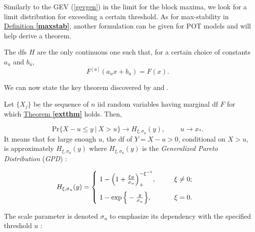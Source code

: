 Similarly to the GEV (\ref{gevgen}) in the limit for the block maxima, we look for a limit distribution for exceeding a certain threshold. As for max-stability in \hyperref[maxstab]{Definition \textbf{\ref{maxstab}}}, another formulation can be given for POT models and will help derive a theorem.

\begin{definition}%
	The dfs $H$ are the only continuous one such that, for a certain choice of constants $a_u$ and $b_u$, 
	\begin{equation*}
	F^{[u]}(a_ux+b_u)=F(x).
	\end{equation*}
\end{definition}
We can now state the key theorem discovered by \citet{balkema_residual_1974} and \citet{iii_statistical_1975-1}.

\begin{theorem}\label{thm:gpd}
	Let $\{X_j\}$ be the sequence of $n$ iid random variables having marginal df $F$ for which \hyperref[extthm]{Theorem \textbf{\ref{extthm}}} holds. Then,

	\begin{equation} \label{gpdconv}
	\text{Pr}\big\{X-u\leq y\ |\ X>u\big\}\longrightarrow H_{\xi,\sigma_u}(y), \ \ \ \ \ \ \ \ \ \ u\to x_*.
	\end{equation}
	It means that for large enough $u$, the df of  $Y=X-u>0$, conditional on $X>u$, is approximately $H_{\xi,\sigma_u}(y)$ where $H_{\xi,\sigma_u}(y)$ is the \emph{Generalized Pareto Distribution} (\emph{GPD}) :
	
	\begin{equation}\label{gpdeq}
	H_{\xi,\sigma_u}(y)=
	\renewcommand{\arraystretch}{0.6}\left\{\begin{array}{@{}l@{\quad}l@{}}
	\ 1-\Big(1+\frac{\xi y}{\sigma_u}\Big)_+^{-\xi^{-1}}, \ \ \ \ \ \  \ \ \xi\neq 0; \\ 
	\vspace{0.0002cm} \\
	\ 1-\exp\Big\{-\frac{y}{\sigma_u}\Big\}, \ \ \ \ \ \ \ \ \ \ \xi=0.
	
	\end{array}\right.\kern-\nulldelimiterspace
	\end{equation}
	
\end{theorem}
The scale parameter is denoted $\sigma_u$ to emphasize its dependency with the specified threshold $u$ :

